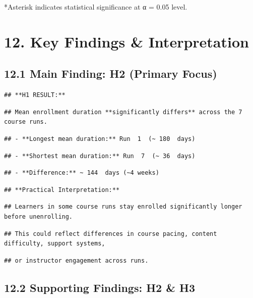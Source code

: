 \documentclass[
]{article}
\begin{document}
*Asterisk indicates statistical significance at α = 0.05 level.

\section{12. Key Findings \&
Interpretation}\label{key-findings-interpretation}

\subsection{12.1 Main Finding: H2 (Primary
Focus)}\label{main-finding-h2-primary-focus}

\begin{verbatim}
## **H1 RESULT:**
\end{verbatim}

\begin{verbatim}
## Mean enrollment duration **significantly differs** across the 7 course runs.
\end{verbatim}

\begin{verbatim}
## - **Longest mean duration:** Run  1  (~ 180  days)
\end{verbatim}

\begin{verbatim}
## - **Shortest mean duration:** Run  7  (~ 36  days)
\end{verbatim}

\begin{verbatim}
## - **Difference:** ~ 144  days (~4 weeks)
\end{verbatim}

\begin{verbatim}
## **Practical Interpretation:**
\end{verbatim}

\begin{verbatim}
## Learners in some course runs stay enrolled significantly longer before unenrolling.
\end{verbatim}

\begin{verbatim}
## This could reflect differences in course pacing, content difficulty, support systems,
\end{verbatim}

\begin{verbatim}
## or instructor engagement across runs.
\end{verbatim}

\subsection{12.2 Supporting Findings: H2 \&
H3}\label{supporting-findings-h2-h3}
\end{document}
